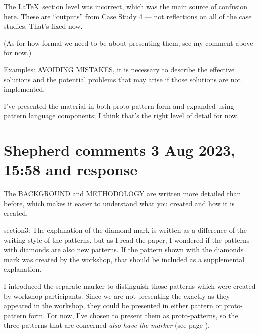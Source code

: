 \documentclass[acmlarge,timestamp]{acmart}
\begin{document}
\begin{rightbubbles}
The \LaTeX\ section level was incorrect, which was the main source of
confusion here.  These are “outputs” from Case Study 4 — not
reflections on all of the case studies.  That’s fixed now.  {\large {}}

(As for how formal we need to be about presenting them, see my comment
above for now.)
\end{rightbubbles}

\begin{leftbubbles}
Examples: AVOIDING MISTAKES, it is necessary to describe the effective
solutions and the potential problems that may arise if those solutions
are not implemented.
\end{leftbubbles}

\begin{rightbubbles}
I’ve presented the material in both proto-pattern form and expanded
using pattern language components; I think that’s the right level of
detail for now. {\large {}}
\end{rightbubbles}

\section{Shepherd comments 3 Aug 2023, 15:58 and response}

\begin{leftbubbles}
The BACKGROUND and METHODOLOGY are written more detailed than before, which makes it easier to understand what you created and how it is created.
\end{leftbubbles}

\begin{rightbubbles}
{\large {}}
\end{rightbubbles}

\begin{leftbubbles}
section3: The explanation of the diamond mark is written as a difference of the writing style of the patterns, but as I read the paper, I wondered if the patterns with diamonds are also new patterns. If the pattern shown with the diamonds mark was created by the workshop, that should be included as a supplemental explanation.
\end{leftbubbles}

\begin{rightbubbles}
I introduced the separate {\normalsize {}} marker to distinguish those
patterns which were created by workshop participants.  Since we are
not presenting the exactly as they appeared in the workshop, they
could be presented in either pattern or proto-pattern form.  For now,
I’ve chosen to present them as proto-patterns, so the three patterns
that are concerned \emph{also have the} {\normalsize {}} \emph{marker} (see page \pageref{mnemonic-for-stepper}). {\large {}}
\end{rightbubbles}
\end{document}
